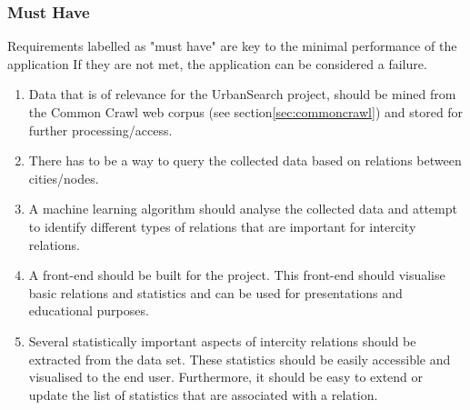 \subsubsection {Must Have}
Requirements labelled as "must have" are key to the minimal performance of the application If they are not met, the application can be considered a failure.

\begin{enumerate}
    \item Data that is of relevance for the UrbanSearch project, should be mined from the Common Crawl web corpus (see section\ref{sec:commoncrawl}) and stored for further processing/access.
    \item There has to be a way to query the collected data based on relations between cities/nodes.
    \item A machine learning algorithm should analyse the collected data and attempt to identify different types of relations that are important for intercity relations.
    \item A front-end should be built for the project. This front-end should visualise basic relations and statistics and can be used for presentations and educational purposes.
    \item Several statistically important aspects of intercity relations should be extracted from the data set. These statistics should be easily accessible and visualised to the end user. Furthermore, it should be easy to extend or update the list of statistics that are associated with a relation.
\end{enumerate}
\iffalse
\begin{enumerate}
    \item A user must be able to select place names.
    \item The system must display a map with the before mentioned places and the important connection they have to other places.
    \item A user must be able to choose a connection between two places and get information about what kind of relations they have.
    \item The strength of all relations must be displayed.
    \item The user must be able to export the found connections and their strengths between places.
    \item Data, that is of relevance for the UrbanSearch project, should be mined from the Common Crawl web corpus and stored for further processing/access. 
    \item A machine learning algorithm should analyse the collected data and attempt to identify different types of relations that are important for intercity relations.
    \item Several statistically important aspects of intercity relations should be extracted from the data set. These statistics should be easily accessible and understandable to the end user. Which statistics are important is one of the research topics of this project, so it should be easy to extend/update the list of statistics that are associated with a relation.

\end{enumerate}
\fi
